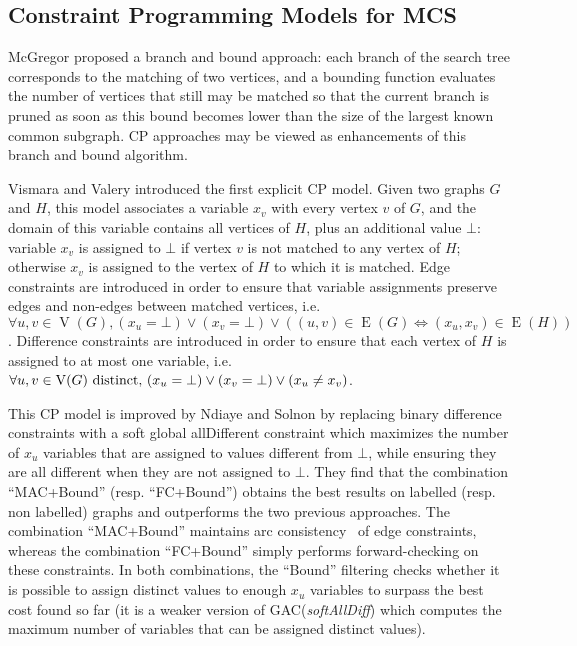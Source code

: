 \documentclass{llncs}
\begin{document}
\subsection{Constraint Programming Models for MCS} \label{CP}

McGregor \cite{McGreg82} proposed a branch and bound approach: each branch of the search tree
corresponds to the matching of two vertices, and a bounding function evaluates the number of
vertices that still may be matched so that the current branch is pruned as soon as this bound
becomes lower than the size of the largest known common subgraph. CP approaches may be viewed as
enhancements of this branch and bound algorithm.

Vismara and Valery  \cite{DBLP:conf/mco/VismaraV08} introduced the first explicit CP model. Given
two graphs $G$ and $H$, this model associates a variable $x_v$ with every vertex $v$ of $G$, and the
domain of this variable contains all vertices of $H$, plus an additional value $\bot$: variable
$x_v$ is assigned to $\bot$ if vertex $v$ is not matched to any vertex of $H$; otherwise $x_v$ is
assigned to the vertex of $H$ to which it is matched. Edge constraints are introduced in order to
ensure that variable assignments preserve edges and non-edges between matched vertices, i.e.\ $\forall u, v \in
\operatorname{V}(G), (x_u = \bot) \vee (x_v = \bot) \vee ((u, v) \in \operatorname{E}(G)
\Leftrightarrow (x_u, x_v) \in \operatorname{E}(H))$.  Difference constraints are introduced in
order to ensure that each vertex of $H$ is assigned to at most one variable, i.e.\ $\forall u, v \in
\operatorname{V}(G)~\textnormal{distinct,}~ (x_u = \bot) \vee (x_v = \bot) \vee (x_u \neq x_v)$.

This CP model is improved by Ndiaye and Solnon \cite{DBLP:conf/cp/NdiayeS11} by replacing binary
difference constraints with a soft global allDifferent constraint which maximizes the number of
$x_u$ variables that are assigned to values different from $\bot$, while ensuring they are all
different when they are not assigned to $\bot$. They find that the combination ``MAC+Bound'' (resp.
``FC+Bound'') obtains the best results on labelled (resp. non labelled) graphs and outperforms the
two previous approaches. The combination ``MAC+Bound'' maintains arc consistency~\cite{sabi94} of
edge constraints, whereas the combination ``FC+Bound'' simply performs forward-checking on these
constraints. In both combinations, the ``Bound'' filtering checks whether it is possible to assign
distinct values to enough $x_u$ variables to surpass the best cost found so far (it is a weaker
version of GAC(\emph{softAllDiff}) \cite{peti01} which computes the maximum number of variables that
can be assigned distinct values).
\end{document}
